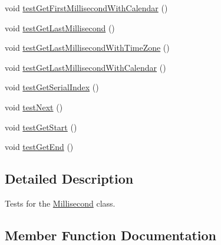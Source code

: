 \begin{DoxyCompactItemize}
void \mbox{\hyperlink{classorg_1_1jfree_1_1data_1_1time_1_1_millisecond_test_a872c13e0bceb912bb65c76e29f04e168}{test\+Get\+First\+Millisecond\+With\+Calendar}} ()
\item 
void \mbox{\hyperlink{classorg_1_1jfree_1_1data_1_1time_1_1_millisecond_test_ac5c751a6244419b8e09fcbdc89da4fa5}{test\+Get\+Last\+Millisecond}} ()
\item 
void \mbox{\hyperlink{classorg_1_1jfree_1_1data_1_1time_1_1_millisecond_test_a70acf253d42cd7f06221d6f53a673c88}{test\+Get\+Last\+Millisecond\+With\+Time\+Zone}} ()
\item 
void \mbox{\hyperlink{classorg_1_1jfree_1_1data_1_1time_1_1_millisecond_test_a53cf9dea02bbf2804bc7056853201e88}{test\+Get\+Last\+Millisecond\+With\+Calendar}} ()
\item 
void \mbox{\hyperlink{classorg_1_1jfree_1_1data_1_1time_1_1_millisecond_test_acfddcfe05f14f27a42c5d94ee47e075d}{test\+Get\+Serial\+Index}} ()
\item 
void \mbox{\hyperlink{classorg_1_1jfree_1_1data_1_1time_1_1_millisecond_test_ae2553577faa2fb2ee9c6ace7276edf04}{test\+Next}} ()
\item 
void \mbox{\hyperlink{classorg_1_1jfree_1_1data_1_1time_1_1_millisecond_test_a171a13a8ffd229c9b19cfa1819317ff9}{test\+Get\+Start}} ()
\item 
void \mbox{\hyperlink{classorg_1_1jfree_1_1data_1_1time_1_1_millisecond_test_a799624876d3f615105a53b459e979b58}{test\+Get\+End}} ()
\end{DoxyCompactItemize}


\subsection{Detailed Description}
Tests for the \mbox{\hyperlink{classorg_1_1jfree_1_1data_1_1time_1_1_millisecond}{Millisecond}} class. 

\subsection{Member Function Documentation}
\mbox{\label{classorg_1_1jfree_1_1data_1_1time_1_1_millisecond_test_a06791ca82d25dad7b89259387ed7ba94}} 
